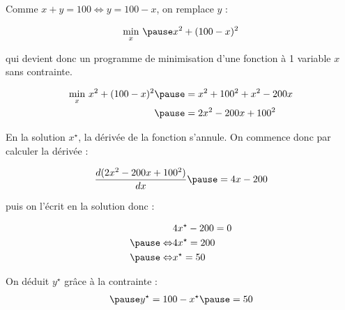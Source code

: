 \documentclass[9pt,handout,professionalfonts,hyperref]{beamer}
\begin{document}
\begin{frame}
	
	Comme 
	$x+y=100  \Leftrightarrow y=100-x
	$, on remplace $y$ :
	
	\[\begin{aligned}
	\underset{x}{\min}~\pause x^2 + (100-x)^2 
	\end{aligned}\]
	
	qui devient donc un programme de minimisation d'une fonction à 1 variable $x$ sans contrainte.
	
\end{frame}

\begin{frame}
	\[\begin{aligned}
	\underset{x}{\min}~x^2 + (100-x)^2  \pause &= x^2 + 100^2 + x^2 - 200x \\\pause &= 2x^2 -200x + 100^2
	\end{aligned}\]
	
\pause 	En la solution $x^\star$, la dérivée de la fonction s'annule. On commence donc par calculer la dérivée :
	
	\[\begin{aligned}
	\frac{d(2x^2 -200x + 100^2)}{dx} \pause = 4x -200 
	\end{aligned}\]
	
\pause puis on l'écrit en la solution donc :
	
	\[\begin{aligned}
	&4x^\star -200=0\\
	\pause \Leftrightarrow&4x^\star=200\\
	\pause \Leftrightarrow&x^\star=50\\
	\end{aligned}\]
	
	On déduit $y^\star$ grâce à la contrainte : 
	\[\begin{aligned}
	\pause y^\star=100-x^\star \pause = 50
	\end{aligned}\]
	
\end{frame}
\end{document}
